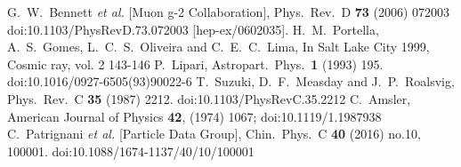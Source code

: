 \begin{thebibliography}{9}
G.~W.~Bennett {\it et al.} [Muon g-2 Collaboration],
Phys.\ Rev.\ D {\bf 73} (2006) 072003
doi:10.1103/PhysRevD.73.072003
[hep-ex/0602035].
H.~M.~Portella, A.~S.~Gomes, L.~C.~S.~Oliveira and C.~E.~C.~Lima,
In Salt Lake City 1999, Cosmic ray, vol. 2 143-146
P.~Lipari,
Astropart.\ Phys.\  {\bf 1} (1993) 195.
doi:10.1016/0927-6505(93)90022-6
T.~Suzuki, D.~F.~Measday and J.~P.~Roalsvig,
Phys.\ Rev.\ C {\bf 35} (1987) 2212.
doi:10.1103/PhysRevC.35.2212
C.~Amsler, 
American Journal of Physics {\bf 42}, (1974) 1067;  
doi:10.1119/1.1987938
C.~Patrignani {\it et al.} [Particle Data Group],
Chin.\ Phys.\ C {\bf 40} (2016) no.10,  100001.
doi:10.1088/1674-1137/40/10/100001
\end{thebibliography}
